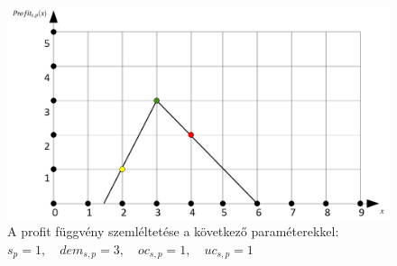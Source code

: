 \begin{figure}
\begin{center}
\includegraphics[scale=0.38]{profit_func}
\caption[A profit függvény szemléltetése a következő paraméterekkel:; $s_p=1,\quad dem_{s,p}=3, \quad oc_{s,p}=1, \quad  uc_{s,p}=1$]
    {A profit függvény szemléltetése a következő paraméterekkel: \\ $s_p=1,\quad dem_{s,p}=3, \quad oc_{s,p}=1, \quad  uc_{s,p}=1$\endtabular}
\label{profit_func}
\end{center}
\end{figure}
